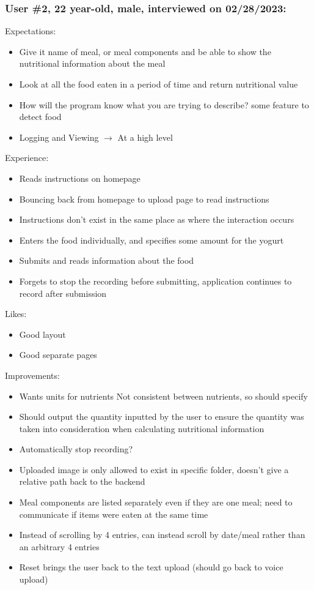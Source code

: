 \documentclass[12pt, titlepage]{article}
\begin{document}
	\subsubsection*{User \#2, 22 year-old, male, interviewed on 02/28/2023:}
	Expectations:
	\begin{itemize}
		\item Give it name of meal, or meal components and be able to show the nutritional
		information about the meal
		\item Look at all the food eaten in a period of time and return nutritional value
		\item How will the program know what you are trying to describe? some feature to detect
		food
		\item Logging and Viewing $\rightarrow$ At a high level
	\end{itemize}
	Experience:
	\begin{itemize}
		\item Reads instructions on homepage
		\item Bouncing back from homepage to upload page to read instructions
		\item Instructions don’t exist in the same place as where the interaction occurs
		\item Enters the food individually, and specifies some amount for the yogurt
		\item Submits and reads information about the food
		\item Forgets to stop the recording before submitting, application continues to record
		after submission
	\end{itemize}
	Likes:
	\begin{itemize}
		\item Good layout
		\item Good separate pages
	\end{itemize}
	Improvements:
	\begin{itemize}
		\item Wants units for nutrients
		\subitem Not consistent between nutrients, so should specify
		\item Should output the quantity inputted by the user to ensure the quantity was taken into consideration when calculating nutritional information
		\item Automatically stop recording?
		\item Uploaded image is only allowed to exist in specific folder, doesn’t give a relative
		path back to the backend
		\item Meal components are listed separately even if they are one meal; need to communicate
		if items were eaten at the same time
		\item Instead of scrolling by 4 entries, can instead scroll by date/meal rather than an arbitrary
		4 entries
		\item Reset brings the user back to the text upload (should go back to voice upload)
	\end{itemize}
\end{document}
